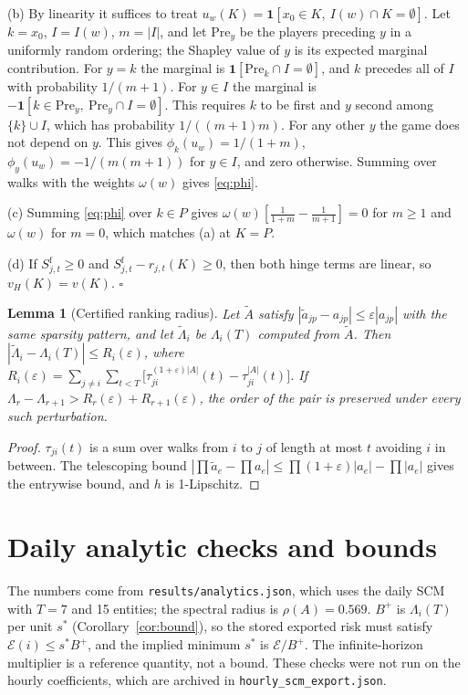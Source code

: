 \documentclass[referee,pdflatex,sn-mathphys-ay]{sn-jnl}
\theoremstyle{thmstyleone}%
\newtheorem{lemma}{Lemma}%
\theoremstyle{thmstyletwo}%
\theoremstyle{thmstylethree}%
\begin{document}
\begin{appendices}
(b) By linearity it suffices to treat $u_w(K)=\mathbf 1[x_0\in K,\ I(w)\cap K=\emptyset]$. Let
$k=x_0$, $I=I(w)$, $m=|I|$, and let $\mathrm{Pre}_y$ be the players preceding $y$ in a uniformly
random ordering; the Shapley value of $y$ is its expected marginal contribution. For $y=k$ the
marginal is $\mathbf 1[\mathrm{Pre}_k\cap I=\emptyset]$, and $k$ precedes all of $I$ with
probability $1/(m+1)$. For $y\in I$ the marginal is $-\mathbf 1[k\in\mathrm{Pre}_y,\ \mathrm{Pre}_y\cap I=\emptyset]$.
This requires $k$ to be first and $y$ second among $\{k\}\cup I$, which has probability
$1/((m+1)m)$. For any other $y$ the game does not depend on $y$. This gives
$\phi_k(u_w)=1/(1+m)$, $\phi_y(u_w)=-1/(m(m+1))$ for $y\in I$, and zero otherwise. Summing
over walks with the weights $\omega(w)$ gives \eqref{eq:phi}.

(c) Summing \eqref{eq:phi} over $k\in P$ gives $\omega(w)[\tfrac1{1+m}-\tfrac1{m+1}]=0$ for $m\ge1$ and $\omega(w)$ for $m=0$, which matches (a) at $K=P$.

(d) If $S^{\mathrm f}_{j,t}\ge0$ and $S^{\mathrm f}_{j,t}-r_{j,t}(K)\ge0$, then both hinge terms are linear, so
$v_H(K)=v(K)$. \hfill$\square$

\begin{lemma}[Certified ranking radius]
\label{lem:radius}
Let $\tilde A$ satisfy $|\tilde a_{jp}-a_{jp}|\le\varepsilon|a_{jp}|$ with the same sparsity
pattern, and let $\tilde\Lambda_i$ be $\Lambda_i(T)$ computed from $\tilde A$. Then
$|\tilde\Lambda_i-\Lambda_i(T)|\le R_i(\varepsilon)$, where
$R_i(\varepsilon)=\sum_{j\ne i}\sum_{t<T}\big[\tau^{(1+\varepsilon)|A|}_{ji}(t)-\tau^{|A|}_{ji}(t)\big]$.
If $\Lambda_r-\Lambda_{r+1}>R_r(\varepsilon)+R_{r+1}(\varepsilon)$, the order of the pair is
preserved under every such perturbation.
\end{lemma}
\begin{proof}
$\tau_{ji}(t)$ is a sum over walks from $i$ to $j$ of length at most $t$ avoiding $i$ in between. The telescoping bound $|\prod\tilde a_e-\prod a_e|\le\prod(1+\varepsilon)|a_e|-\prod|a_e|$ gives the entrywise bound, and $h$ is 1-Lipschitz.
\end{proof}

\section{Daily analytic checks and bounds}\label{app:bounds}
\setcounter{table}{0}

The numbers come from \texttt{results/analytics.json}, which uses the daily SCM with $T=7$ and 15 entities; the
spectral radius is $\rho(A)=0.569$. $B^+$ is $\Lambda_i(T)$ per unit $s^\ast$ (Corollary~\ref{cor:bound}), so the stored
exported risk must satisfy $\mathcal{E}(i)\le s^\ast B^+$, and the implied minimum $s^\ast$ is $\mathcal{E}/B^+$. The
infinite-horizon multiplier is a reference quantity, not a bound. These checks were not
run on the hourly coefficients, which are archived in \texttt{hourly\_scm\_export.json}.


\end{appendices}
\end{document}
